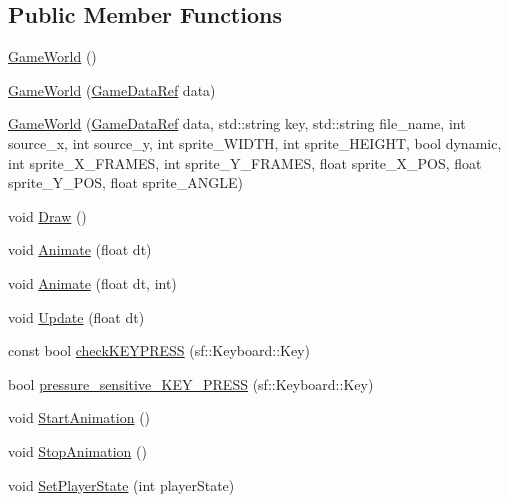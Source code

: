 \subsection*{Public Member Functions}
\begin{DoxyCompactItemize}
\item 
\hyperlink{classSekander_1_1GameWorld_a4eba015ae47c7e54c545a874906be1c1}{Game\+World} ()
\item 
\hyperlink{classSekander_1_1GameWorld_a3d57a6627443dcb871f2cc44dd8c5be6}{Game\+World} (\hyperlink{namespaceSekander_a1d69b002ba2d23020901c28f0def5e16}{Game\+Data\+Ref} data)
\item 
\hyperlink{classSekander_1_1GameWorld_a7e626b7986bea0d59a262aac5f47f0cd}{Game\+World} (\hyperlink{namespaceSekander_a1d69b002ba2d23020901c28f0def5e16}{Game\+Data\+Ref} data, std\+::string key, std\+::string file\+\_\+name, int source\+\_\+x, int source\+\_\+y, int sprite\+\_\+\+W\+I\+D\+TH, int sprite\+\_\+\+H\+E\+I\+G\+HT, bool dynamic, int sprite\+\_\+\+X\+\_\+\+F\+R\+A\+M\+ES, int sprite\+\_\+\+Y\+\_\+\+F\+R\+A\+M\+ES, float sprite\+\_\+\+X\+\_\+\+P\+OS, float sprite\+\_\+\+Y\+\_\+\+P\+OS, float sprite\+\_\+\+A\+N\+G\+LE)
\item 
void \hyperlink{classSekander_1_1GameWorld_aefbdb2473bee50c10a5380e7a6892a60}{Draw} ()
\item 
void \hyperlink{classSekander_1_1GameWorld_ad5c3fd7f0c1347d393df075cea46177e}{Animate} (float dt)
\item 
void \hyperlink{classSekander_1_1GameWorld_aa736a4234102bbdbc87dbeb8726d2ce8}{Animate} (float dt, int)
\item 
void \hyperlink{classSekander_1_1GameWorld_a827c7077336d604dd4854196cc6be334}{Update} (float dt)
\item 
const bool \hyperlink{classSekander_1_1GameWorld_a0d0376040dc0171aecdbb5b618741b8b}{check\+K\+E\+Y\+P\+R\+E\+SS} (sf\+::\+Keyboard\+::\+Key)
\item 
bool \hyperlink{classSekander_1_1GameWorld_a543c52aad77747a2f34b5927041ac905}{pressure\+\_\+sensitive\+\_\+\+K\+E\+Y\+\_\+\+P\+R\+E\+SS} (sf\+::\+Keyboard\+::\+Key)
\item 
void \hyperlink{classSekander_1_1GameWorld_a658b6f36a3476b2b8ef0f69a2f0ceac3}{Start\+Animation} ()
\item 
void \hyperlink{classSekander_1_1GameWorld_a1a6c95bf62b4ebb4a9269ebe4ef8ec8b}{Stop\+Animation} ()
\item 
void \hyperlink{classSekander_1_1GameWorld_a38ce97f68d23c6592bc84971db21354f}{Set\+Player\+State} (int player\+State)

\end{DoxyCompactItemize}
